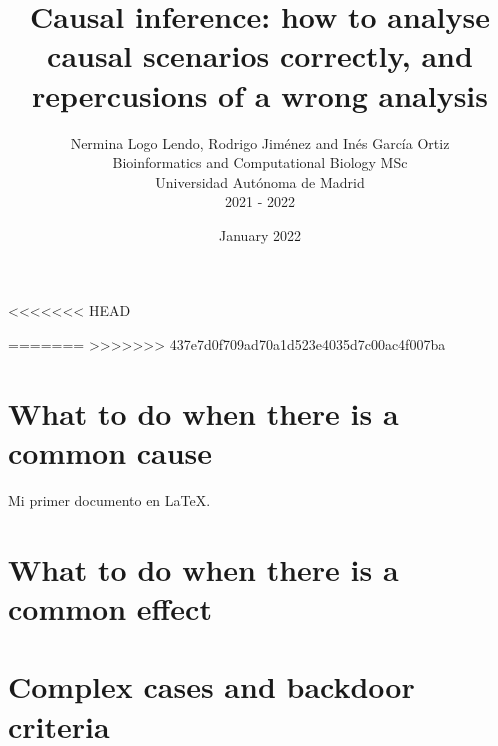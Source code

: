 \documentclass{article}
\title{Causal inference: how to analyse causal scenarios correctly, and repercusions of a wrong analysis}
\author{Nermina Logo Lendo, Rodrigo Jiménez and Inés García Ortiz\\
      Bioinformatics and Computational Biology MSc\\
      Universidad Autónoma de Madrid\\
      2021 - 2022}
\date{January 2022}
\begin{document}
<<<<<<< HEAD

=======
>>>>>>> 437e7d0f709ad70a1d523e4035d7c00ac4f007ba
\maketitle


\section*{What to do when there is a common cause}
Mi primer documento en \LaTeX{}.


\section*{What to do when there is a common effect}


\section*{Complex cases and backdoor criteria}
\end{document}
